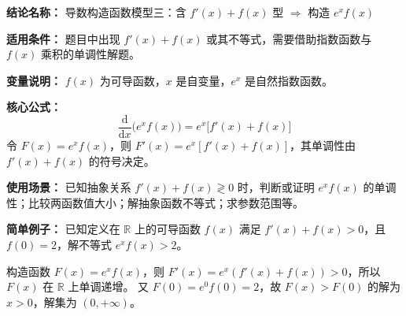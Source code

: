 \textbf{结论名称：} 导数构造函数模型三：含 \(f'(x)+f(x)\) 型 \(\Rightarrow\) 构造 \(e^{x}f(x)\)

\textbf{适用条件：} 题目中出现 \(f'(x)+f(x)\) 或其不等式，需要借助指数函数与 \(f(x)\) 乘积的单调性解题。

\textbf{变量说明：} \(f(x)\) 为可导函数，\(x\) 是自变量，\(e^{x}\) 是自然指数函数。

\textbf{核心公式：}
\[
    \boxed{\frac{\mathrm{d}}{\mathrm{d}x}\bigl(e^{x}f(x)\bigr)=e^{x}\bigl[f'(x)+f(x)\bigr]}
\]
令 \(F(x)=e^{x}f(x)\)，则 \(F'(x)=e^{x}[f'(x)+f(x)]\)，其单调性由 \(f'(x)+f(x)\) 的符号决定。

\textbf{使用场景：} 已知抽象关系 \(f'(x)+f(x)\gtrless 0\) 时，判断或证明 \(e^{x}f(x)\) 的单调性；比较两函数值大小；解抽象函数不等式；求参数范围等。

\textbf{简单例子：} 已知定义在 \(\mathbb{R}\) 上的可导函数 \(f(x)\) 满足 \(f'(x)+f(x)>0\)，且 \(f(0)=2\)，解不等式 \(e^{x}f(x)>2\)。

构造函数 \(F(x)=e^{x}f(x)\)，则 \(F'(x)=e^{x}(f'(x)+f(x))>0\)，所以 \(F(x)\) 在 \(\mathbb{R}\) 上单调递增。
又 \(F(0)=e^{0}f(0)=2\)，故 \(F(x)>F(0)\) 的解为 \(x>0\)，解集为 \((0,+\infty)\)。